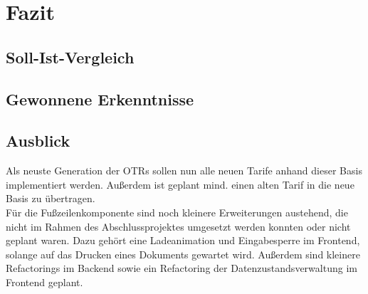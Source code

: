\newpage
\section{Fazit}
\label{fazit}

\subsection{Soll-Ist-Vergleich}
\label{sollIstVgl}

\subsection{Gewonnene Erkenntnisse}
\label{erkenntnisse}

\subsection{Ausblick}
\label{ausblick}
Als neuste Generation der \ac{OTR}s sollen nun alle neuen Tarife anhand dieser Basis implementiert werden. Außerdem ist geplant mind. einen alten Tarif in die neue Basis zu übertragen.\\
Für die Fußzeilenkomponente sind noch kleinere Erweiterungen austehend, die nicht im Rahmen des Abschlussprojektes umgesetzt werden konnten oder nicht geplant waren. Dazu gehört eine Ladeanimation und Eingabesperre im Frontend, solange auf das Drucken eines Dokuments gewartet wird. Außerdem sind kleinere Refactorings im Backend sowie ein Refactoring der Datenzustandsverwaltung im Frontend geplant.